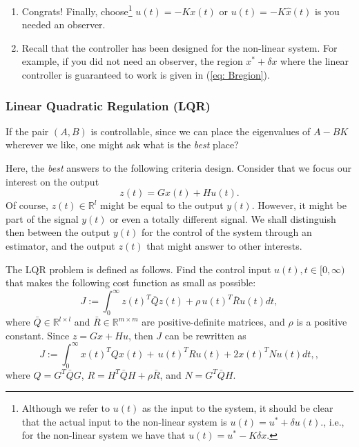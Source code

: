\documentclass[11pt,a4paper,titlepage]{article}
\begin{document}
\begin{enumerate}
\item Congrats! Finally, choose\footnote{Although we refer to $u(t)$ as the input to the system, it should be clear that the actual input to the non-linear system is $u(t) = u^* + \delta u(t).$, i.e., for the non-linear system we have that $u(t) = u^* -K\delta x$.} $u(t) = -Kx(t)$ or $u(t) = -K\hat x(t)$ is you needed an observer.
\item Recall that the controller has been designed for the non-linear system.
	For example, if you did not need an observer, the region $x^* + \delta x$ where the linear controller is guaranteed to work is given in (\ref{eq: Bregion}).
\end{enumerate}

\subsubsection{Linear Quadratic Regulation (LQR)}

If the pair $(A,B)$ is controllable, since we can place the eigenvalues of $A-BK$ wherever we like, one might ask what is the \emph{best} place?

Here, the \emph{best} answers to the following criteria design. Consider that we focus our interest on the output
\begin{equation}
	z(t) = G x(t) + H u(t) \label{eq: z}.
\end{equation}
Of course, $z(t)\in\mathbb{R}^l$ might be equal to the output $y(t)$. However, it might be part of the signal $y(t)$ or even a totally different signal. We shall distinguish then between the output $y(t)$ for the control of the system through an estimator, and the output $z(t)$ that might answer to other interests.

The LQR problem is defined as follows. Find the control input $u(t), t\in[0,\infty)$ that makes the following cost function as small as possible:
\begin{equation}
	J := \int_0^\infty z(t)^T \bar Q z(t) + \rho \, u(t)^T \bar R u(t) dt,
	\label{eq: J}
\end{equation}
where $\bar Q\in\mathbb{R}^{l\times l}$ and $\bar R\in\mathbb{R}^{m\times m}$ are positive-definite matrices, and $\rho$ is a positive constant. Since $z = Gx + Hu$, then $J$ can be rewritten as
\begin{equation}
	J := \int_0^\infty x(t)^T Q x(t) + \, u(t)^T R u(t) + 2x(t)^T N u(t)dt,
	\label{eq: J2},
\end{equation}
where $Q = G^T\bar Q G$, $R = H^T\bar QH + \rho \bar R$, and $N = G^T\bar Q H$.
\end{document}
